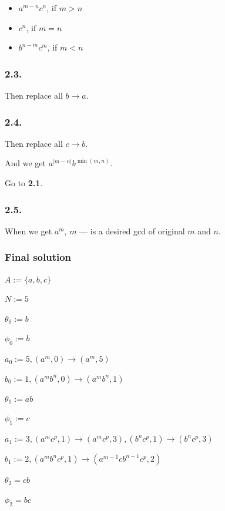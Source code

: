\documentclass{article}
\begin{document}
\begin{itemize}
\item \( a^{m-n}c^{n} \), if \( m > n \)
\item \( c^{n} \), if \( m = n \)
\item \( b^{n-m}c^{m} \), if \( m < n \)
\end{itemize}

\subsubsection*{2.3.}

Then replace all \( b \to a \).

\subsubsection*{2.4.}

Then replace all \( c \to b \).

And we get \( a^{|m-n|}b^{\min(m,n)} \).

Go to \textbf{2.1}.

\subsubsection*{2.5.}

When we get \( a^{m} \), \( m \) --- is a desired gcd of original \( m \) and \( n \).

\subsubsection*{Final solution}

\( A := \{ a, b, c \} \)

\( N := 5 \)

\( \theta_{0} := b \)

\( \phi_{0} := b \)

\( a_{0} := 5, (a^{m}, 0) \to (a^{m}, 5) \)

\( b_{0} := 1, (a^{m}b^{n}, 0) \to (a^{m}b^{n}, 1) \)

\( \theta_{1} := ab \)

\( \phi_{1} := c \)

\( a_{1} := 3, (a^{m}c^{p}, 1) \to (a^{m}c^{p}, 3), (b^{n}c^{p}, 1) \to (b^{n}c^{p}, 3) \)

\( b_{1} := 2, (a^{m}b^{n}c^{p}, 1) \to (a^{m-1}cb^{n-1}c^{p}, 2) \)

\( \theta_{2} = cb \)

\( \phi_{2} = bc \)
\end{document}
